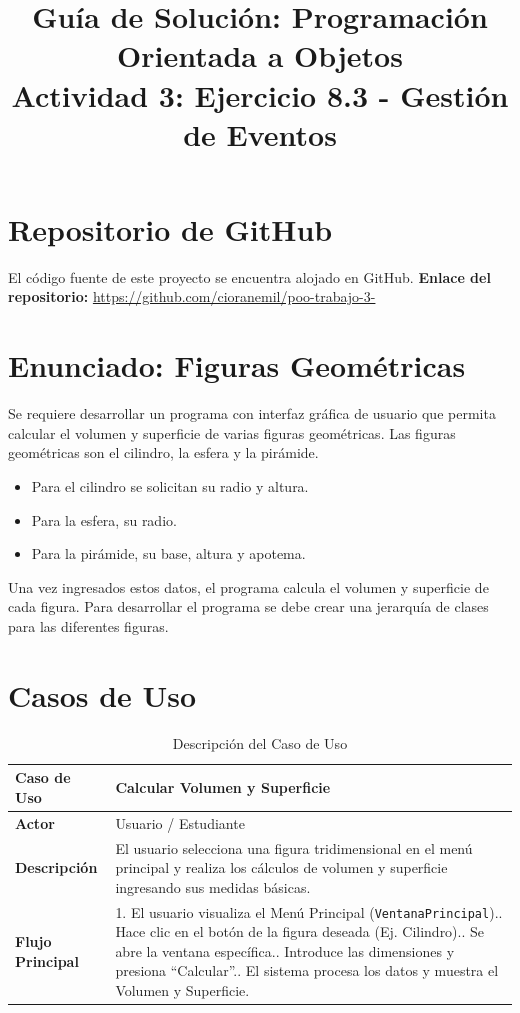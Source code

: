 \documentclass[12pt,a4paper]{article}
\title{\textbf{Guía de Solución: Programación Orientada a Objetos} \\ \large Actividad 3: Ejercicio 8.3 - Gestión de Eventos}
\author{}
\date{}
\begin{document}
\maketitle

\section{Repositorio de GitHub}
El código fuente de este proyecto se encuentra alojado en GitHub. 
\newline
\textbf{Enlace del repositorio:} \url{https://github.com/cioranemil/poo-trabajo-3-}

\section{Enunciado: Figuras Geométricas}
Se requiere desarrollar un programa con interfaz gráfica de usuario que permita calcular el volumen y superficie de varias figuras geométricas. Las figuras geométricas son el cilindro, la esfera y la pirámide.
\begin{itemize}
    \item Para el cilindro se solicitan su radio y altura.
    \item Para la esfera, su radio.
    \item Para la pirámide, su base, altura y apotema.
\end{itemize}
Una vez ingresados estos datos, el programa calcula el volumen y superficie de cada figura. Para desarrollar el programa se debe crear una jerarquía de clases para las diferentes figuras.

\section{Casos de Uso}
\begin{table}[h]
    \centering
    \begin{tabular}{|p{3cm}|p{12cm}|}
    \hline
    \textbf{Caso de Uso} & \textbf{Calcular Volumen y Superficie} \\ \hline
    \textbf{Actor} & Usuario / Estudiante \\ \hline
    \textbf{Descripción} & El usuario selecciona una figura tridimensional en el menú principal y realiza los cálculos de volumen y superficie ingresando sus medidas básicas. \\ \hline
    \textbf{Flujo Principal} & 
    1. El usuario visualiza el Menú Principal (\texttt{VentanaPrincipal}).\newline
    2. Hace clic en el botón de la figura deseada (Ej. Cilindro).\newline
    3. Se abre la ventana específica.\newline
    4. Introduce las dimensiones y presiona ``Calcular''.\newline
    5. El sistema procesa los datos y muestra el Volumen y Superficie. \\ \hline
    \end{tabular}
    \caption{Descripción del Caso de Uso}
\end{table}
\end{document}
